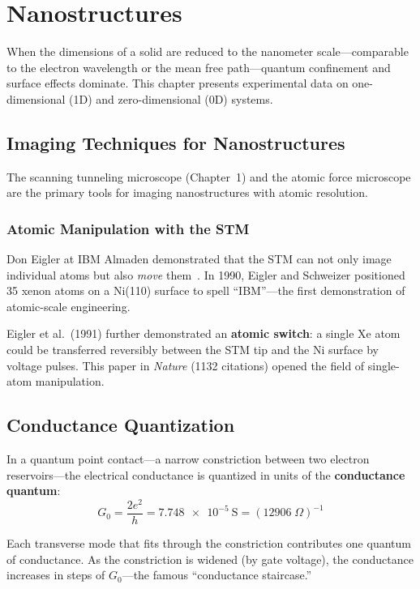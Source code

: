 \chapter{Nanostructures}

When the dimensions of a solid are reduced to the nanometer scale---comparable to the electron wavelength or the mean free path---quantum confinement and surface effects dominate. This chapter presents experimental data on one-dimensional (1D) and zero-dimensional (0D) systems.

\section{Imaging Techniques for Nanostructures}

The scanning tunneling microscope (Chapter~1) and the atomic force microscope are the primary tools for imaging nanostructures with atomic resolution.

\subsection{Atomic Manipulation with the STM}

Don Eigler at IBM Almaden demonstrated that the STM can not only image individual atoms but also \textit{move} them~\cite{eigler1991switch}. In 1990, Eigler and Schweizer positioned 35 xenon atoms on a Ni(110) surface to spell ``IBM''---the first demonstration of atomic-scale engineering.

Eigler et al.\ (1991) further demonstrated an \textbf{atomic switch}: a single Xe atom could be transferred reversibly between the STM tip and the Ni surface by voltage pulses. This paper in \textit{Nature} (1132 citations) opened the field of single-atom manipulation.


\section{Conductance Quantization}

In a quantum point contact---a narrow constriction between two electron reservoirs---the electrical conductance is quantized in units of the \textbf{conductance quantum}:
\begin{equation}
  G_0 = \frac{2e^2}{h} = \SI{7.748e-5}{\siemens} = (12906\;\Omega)^{-1}
\end{equation}

Each transverse mode that fits through the constriction contributes one quantum of conductance. As the constriction is widened (by gate voltage), the conductance increases in steps of $G_0$---the famous ``conductance staircase.''

